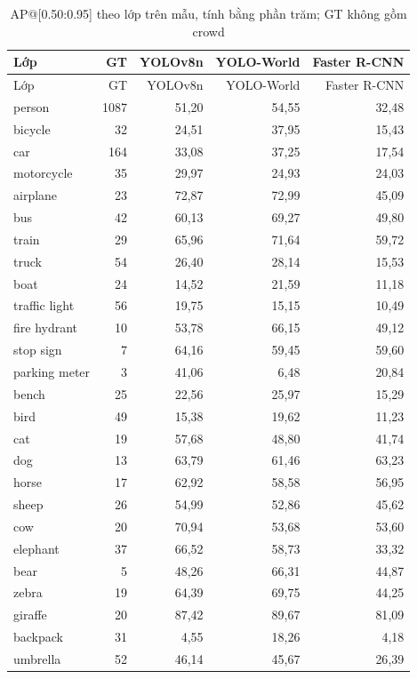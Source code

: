\small\begin{longtable}{lrrrr}
\caption{AP@[0.50:0.95] theo lớp trên mẫu, tính bằng phần trăm; GT không gồm crowd}\label{tab:allclasses}\\
\toprule Lớp & GT & YOLOv8n & YOLO-World & Faster R-CNN \\\midrule\endfirsthead
\toprule Lớp & GT & YOLOv8n & YOLO-World & Faster R-CNN \\\midrule\endhead
person & 1087 & 51{,}20 & 54{,}55 & 32{,}48 \\
bicycle & 32 & 24{,}51 & 37{,}95 & 15{,}43 \\
car & 164 & 33{,}08 & 37{,}25 & 17{,}54 \\
motorcycle & 35 & 29{,}97 & 24{,}93 & 24{,}03 \\
airplane & 23 & 72{,}87 & 72{,}99 & 45{,}09 \\
bus & 42 & 60{,}13 & 69{,}27 & 49{,}80 \\
train & 29 & 65{,}96 & 71{,}64 & 59{,}72 \\
truck & 54 & 26{,}40 & 28{,}14 & 15{,}53 \\
boat & 24 & 14{,}52 & 21{,}59 & 11{,}18 \\
traffic light & 56 & 19{,}75 & 15{,}15 & 10{,}49 \\
fire hydrant & 10 & 53{,}78 & 66{,}15 & 49{,}12 \\
stop sign & 7 & 64{,}16 & 59{,}45 & 59{,}60 \\
parking meter & 3 & 41{,}06 & 6{,}48 & 20{,}84 \\
bench & 25 & 22{,}56 & 25{,}97 & 15{,}29 \\
bird & 49 & 15{,}38 & 19{,}62 & 11{,}23 \\
cat & 19 & 57{,}68 & 48{,}80 & 41{,}74 \\
dog & 13 & 63{,}79 & 61{,}46 & 63{,}23 \\
horse & 17 & 62{,}92 & 58{,}58 & 56{,}95 \\
sheep & 26 & 54{,}99 & 52{,}86 & 45{,}62 \\
cow & 20 & 70{,}94 & 53{,}68 & 53{,}60 \\
elephant & 37 & 66{,}52 & 58{,}73 & 33{,}32 \\
bear & 5 & 48{,}26 & 66{,}31 & 44{,}87 \\
zebra & 19 & 64{,}39 & 69{,}75 & 44{,}25 \\
giraffe & 20 & 87{,}42 & 89{,}67 & 81{,}09 \\
backpack & 31 & 4{,}55 & 18{,}26 & 4{,}18 \\
umbrella & 52 & 46{,}14 & 45{,}67 & 26{,}39 \\

\end{longtable}

